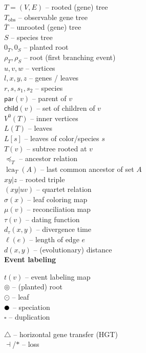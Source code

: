 \documentclass[hidelinks,11pt]{scrreprt}
\DeclareMathOperator{\lca}{lca}
\newcommand{\unrooted}[1]{\overline{#1}}
\newcommand{\ROOT}{\circledcirc}
\newcommand{\LEAF}{\odot}
\newcommand{\SPEC}{\newmoon}
\newcommand{\HGT}{\triangle}
\newcommand{\DUPL}{\square}
\newcommand{\child}{\mathsf{child}}
\newcommand{\parent}{\mathsf{par}}
\begin{document}
{\begin{minipage}[t]{0.47\textwidth}
		\vspace{2mm}
		\noindent
		$T=(V,E)$ -- rooted (gene) tree\\
		$T_{\textrm{obs}}$ -- observable gene tree\\
		$\unrooted{T}$ -- unrooted (gene) tree\\
		$S$ -- species tree\\
		$0_T, 0_S$ -- planted root\\
		$\rho_T, \rho_S$ -- root (first branching event)\\
		$u,v,w$ -- vertices\\
		$l, x, y, z$ -- genes / leaves\\
		$r, s, s_1, s_2$ -- species\\
		$\parent(v)$ -- parent of $v$\\
		$\child(v)$ -- set of children of $v$\\
		$V^0(T)$ -- inner vertices\\
		$L(T)$ -- leaves\\	
		$L[s]$ -- leaves of color/species $s$\\
		$T(v)$ -- subtree rooted at $v$\\
		$\preceq_T$ -- ancestor relation\\
		$\lca_T(A)$ -- last common ancestor of set $A$\\
		$xy|z$ -- rooted triple\\
		$(xy|uv)$ -- quartet relation\\
		$\sigma(x)$ -- leaf coloring map\\
		$\mu(v)$ -- reconciliation map\\
		$\tau(v)$ -- dating function\\
		$d_{\tau}(x,y)$ -- divergence time\\
		$\ell(e)$ -- length of edge $e$\\
		$d(x,y)$ -- (evolutionary) distance\\
		
		\noindent
		\textbf{Event labeling}
		
		\vspace{2mm}
		\noindent
		$t(v)$ -- event labeling map\\
		$\ROOT$ -- (planted) root\\
		$\LEAF$ -- leaf\\
		$\SPEC$ -- speciation\\
		$\DUPL$ -- duplication\\
	\end{minipage}
	\hfill
	\begin{minipage}[t]{0.47\textwidth}
		$\HGT$ -- horizontal gene transfer (HGT)\\
		$\dashv$/$*$ -- loss\\
		

\end{minipage}}
\end{document}
